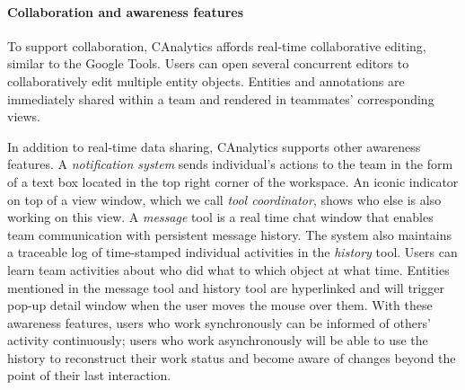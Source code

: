 \paragraph{Collaboration and awareness features}

To support collaboration, CAnalytics affords real-time collaborative editing, similar to the
Google Tools. Users can open several concurrent editors to
collaboratively edit multiple entity objects. Entities and annotations are immediately
shared within a team and rendered in teammates' corresponding views.

In addition to real-time data sharing, CAnalytics supports other awareness features. A \emph{notification system} sends
individual's actions to the team in the form of a text box located in the top
right corner of the workspace. An iconic
indicator on top of a view window, which we call \emph{tool coordinator}, shows who else is also working on this view. A \emph{message} tool is a real time chat window that enables team
communication with persistent message history. The system also maintains
a traceable log of time-stamped individual activities in the \emph{history} tool.
Users can learn team activities about who did what to which object at
what time. Entities mentioned in the message tool and
history tool are hyperlinked and will trigger pop-up detail window when
the user moves the mouse over them. With these awareness features, users who work
synchronously can be informed of others' activity continuously; users
who work asynchronously will be able to use the history to reconstruct
their work status and become aware of changes beyond the point of their
last interaction.
